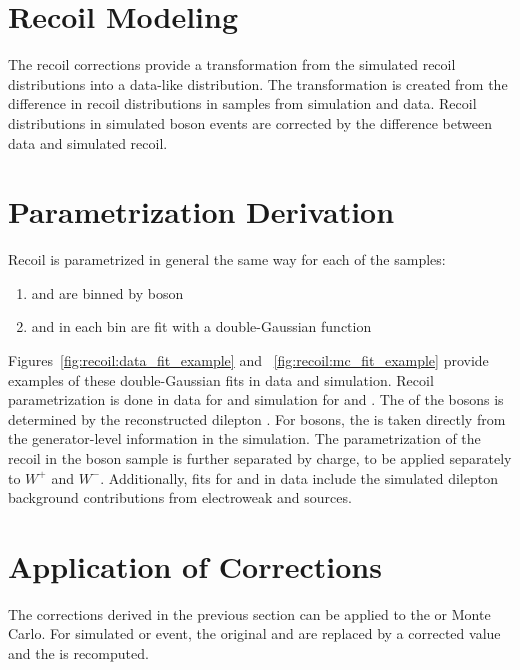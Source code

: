


\section{Recoil Modeling} \label{ch:recoil:modeling}
The recoil corrections provide a transformation from the simulated recoil distributions into a data-like distribution. The transformation is created from the difference in recoil distributions in \zll samples from simulation and data. Recoil distributions in simulated \W boson events are corrected by the difference between data and simulated \zll recoil.

\section{Parametrization Derivation}
Recoil is parametrized in general the same way for each of the samples:
\begin{enumerate}
\item \upar and \uprp are binned by boson \pt
\item \upar and \uprp  in each \pt bin are fit with a double-Gaussian function
\end{enumerate}
Figures~\ref{fig:recoil:data_fit_example}
 and ~\ref{fig:recoil:mc_fit_example} provide examples of these double-Gaussian fits in data and simulation. Recoil parametrization is done in data for \zmm and simulation for \zmm and \wmunu. The \pt of the \Z bosons is determined by the reconstructed dilepton \pt. For \W bosons, the \pt is taken directly from the generator-level information in the simulation. The parametrization of the recoil in the \W boson sample is further separated by charge, to be applied separately to $W^+$ and $W^-$.
Additionally, fits for \upar and \uprp in \Z data include the simulated dilepton background contributions from electroweak and \ttbar sources.





\section{Application of Corrections}\label{ch:recoil:apply}
The corrections derived in the previous section can be applied to the \W or \Z Monte Carlo. For simulated \W or \Z event, the original \upar and \uprp are replaced by a corrected value and the \met is recomputed. 
